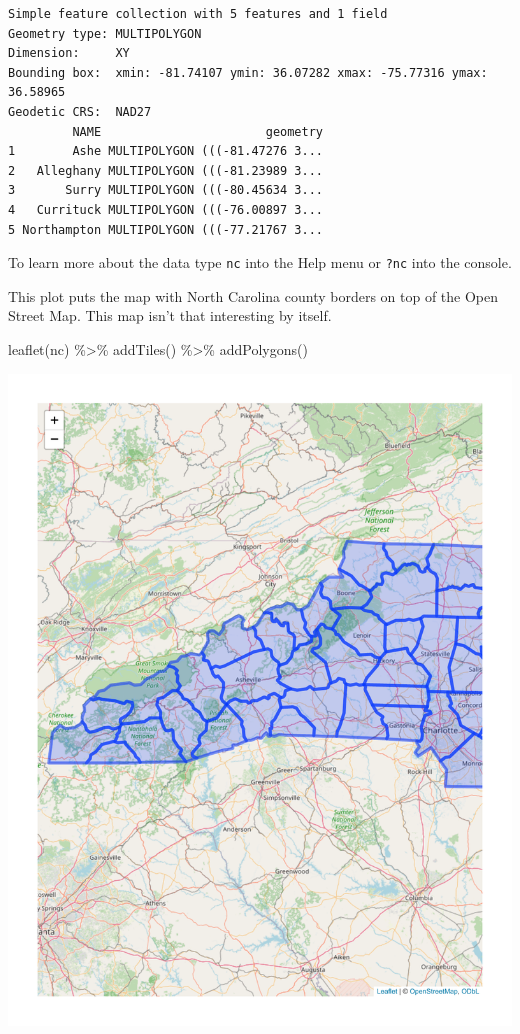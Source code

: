 \documentclass[
  letterpaper,
  DIV=11,
  numbers=noendperiod]{scrreprt}
\newenvironment{Shaded}{\begin{snugshade}}{\end{snugshade}}
\newcommand{\FunctionTok}[1]{\textcolor[rgb]{0.28,0.35,0.67}{#1}}
\newcommand{\NormalTok}[1]{\textcolor[rgb]{0.00,0.23,0.31}{#1}}
\newcommand{\SpecialCharTok}[1]{\textcolor[rgb]{0.37,0.37,0.37}{#1}}
\begin{document}
\begin{verbatim}
Simple feature collection with 5 features and 1 field
Geometry type: MULTIPOLYGON
Dimension:     XY
Bounding box:  xmin: -81.74107 ymin: 36.07282 xmax: -75.77316 ymax: 36.58965
Geodetic CRS:  NAD27
         NAME                       geometry
1        Ashe MULTIPOLYGON (((-81.47276 3...
2   Alleghany MULTIPOLYGON (((-81.23989 3...
3       Surry MULTIPOLYGON (((-80.45634 3...
4   Currituck MULTIPOLYGON (((-76.00897 3...
5 Northampton MULTIPOLYGON (((-77.21767 3...
\end{verbatim}

To learn more about the data type \texttt{nc} into the Help menu or
\texttt{?nc} into the console.

This plot puts the map with North Carolina county borders on top of the
Open Street Map. This map isn't that interesting by itself.

\begin{Shaded}
\begin{Highlighting}[]
\FunctionTok{leaflet}\NormalTok{(nc) }\SpecialCharTok{\%\textgreater{}\%}
  \FunctionTok{addTiles}\NormalTok{() }\SpecialCharTok{\%\textgreater{}\%}
  \FunctionTok{addPolygons}\NormalTok{()}
\end{Highlighting}
\end{Shaded}

\includegraphics{src/06-Spatial_Viz_files/figure-pdf/unnamed-chunk-29-1.pdf}
\end{document}
